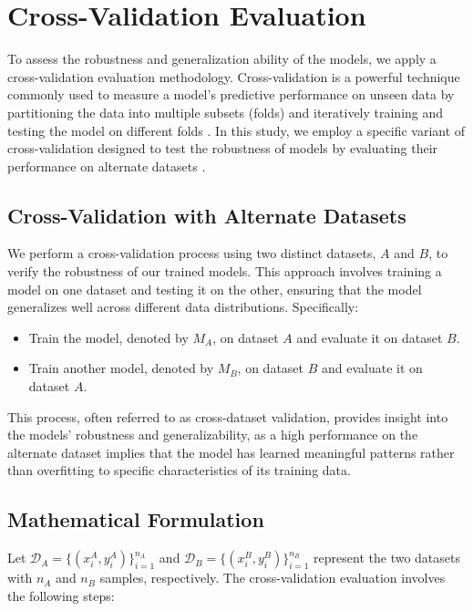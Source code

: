 \section{Cross-Validation Evaluation}

To assess the robustness and generalization ability of the models, we apply a cross-validation evaluation methodology. Cross-validation is a powerful technique commonly used to measure a model's predictive performance on unseen data by partitioning the data into multiple subsets (folds) and iteratively training and testing the model on different folds \cite{jiang2017markov, carmack2012generalised, Bergmeir2012On}. In this study, we employ a specific variant of cross-validation designed to test the robustness of models by evaluating their performance on alternate datasets \cite{Barratt2018OptimizingFG}.

\subsection{Cross-Validation with Alternate Datasets}

We perform a cross-validation process using two distinct datasets, $A$ and $B$, to verify the robustness of our trained models. This approach involves training a model on one dataset and testing it on the other, ensuring that the model generalizes well across different data distributions. Specifically:

\begin{itemize}
    \item Train the model, denoted by $M_A$, on dataset $A$ and evaluate it on dataset $B$.
    \item Train another model, denoted by $M_B$, on dataset $B$ and evaluate it on dataset $A$.
\end{itemize}

This process, often referred to as cross-dataset validation, provides insight into the models' robustness and generalizability, as a high performance on the alternate dataset implies that the model has learned meaningful patterns rather than overfitting to specific characteristics of its training data.

\subsection{Mathematical Formulation}

Let $\mathcal{D}_A = \{(x_i^A, y_i^A)\}_{i=1}^{n_A}$ and $\mathcal{D}_B = \{(x_i^B, y_i^B)\}_{i=1}^{n_B}$ represent the two datasets with $n_A$ and $n_B$ samples, respectively. The cross-validation evaluation involves the following steps:

